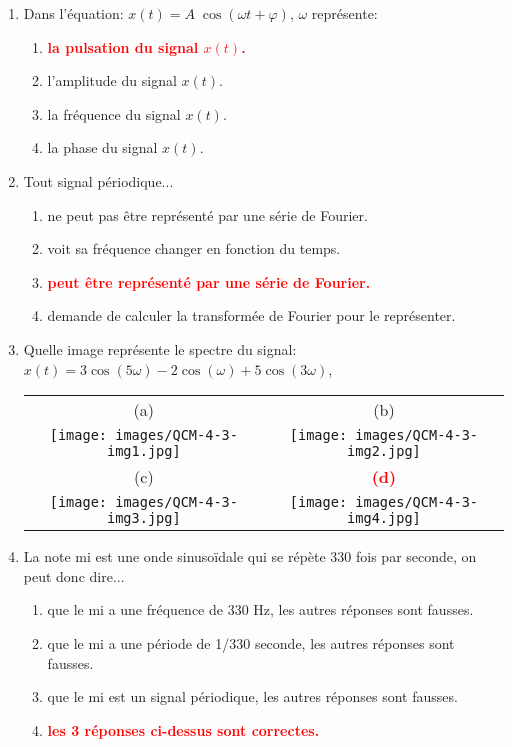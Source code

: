 \documentclass[a4paper]{article}
\begin{document}
\begin{enumerate}[label=Q\arabic*.]


\item Dans l'équation: $ x(t) = A \; \cos( \omega t + \varphi) $, $ \omega $ représente:
\begin{enumerate}
    \item \textcolor{red}{\textbf{la pulsation du signal $ x(t) $.}}
    \item l'amplitude du signal $ x(t) $.
    \item la fréquence du signal $ x(t) $.
    \item la phase du signal $ x(t) $.
\end{enumerate}


\item Tout signal périodique...
\begin{enumerate}
    \item ne peut pas être représenté par une série de Fourier.
    \item voit sa fréquence changer en fonction du temps.
    \item \textcolor{red}{\textbf{peut être représenté par une série de Fourier.}}
    \item demande de calculer la transformée de Fourier pour le représenter.
\end{enumerate}


\item Quelle image représente le spectre du signal: $ x(t) = 3 \cos(5 \omega) - 2 \cos(\omega) + 5 \cos(3 \omega) $,
\begin{center} \begin{tabular}{cc}
    (a) & (b) \\
    \texttt{[image: images/QCM-4-3-img1.jpg]} &
    \texttt{[image: images/QCM-4-3-img2.jpg]} \\
    (c) & \textcolor{red}{\textbf{(d)}} \\
    \texttt{[image: images/QCM-4-3-img3.jpg]} &
    \texttt{[image: images/QCM-4-3-img4.jpg]}
\end{tabular} \end{center}


\item La note mi est une onde sinusoïdale qui se répète 330 fois par seconde, on peut donc dire...
\begin{enumerate}
    \item que le mi a une fréquence de 330 Hz, les autres réponses sont fausses.
    \item que le mi a une période de 1/330 seconde, les autres réponses sont fausses.
    \item que le mi est un signal périodique, les autres réponses sont fausses.
    \item \textcolor{red}{\textbf{les 3 réponses ci-dessus sont correctes.}}
\end{enumerate}



\end{enumerate}
\end{document}
